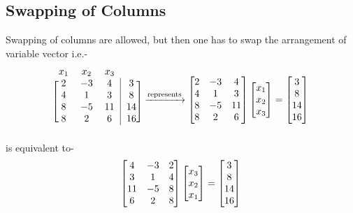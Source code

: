\documentclass{article}
\begin{document}
\subsection{Swapping of Columns}
Swapping of columns are allowed, but then one has to swap the arrangement of variable vector i.e.-
      \[
        \begin{blockarray}{cccc}
        x_1 & x_2 & x_3 && \\
        \begin{block}{[ccc|c]}
        2 & -3 & 4 & 3 \\
        4 & 1 & 3 & 8 \\
        8 & -5 & 11 & 14\\
        8 & 2 & 6 & 16 \\
        \end{block}
        \end{blockarray}
            \xrightarrow{\text{represents}}
               \begin{bmatrix}
                   2 & -3 & 4\\
                   4 & 1 & 3\\
                   8 & -5 & 11\\
                   8 & 2 & 6
               \end{bmatrix}
                    \begin{bmatrix}
                        x_1\\x_2\\x_3
                    \end{bmatrix} = 
                        \begin{bmatrix}
                            3\\8\\14\\16
                        \end{bmatrix}\\
            \]
    is equivalent to-
    \[       
        \begin{bmatrix}
        4 & -3 & 2\\
        3 & 1 & 4\\
        11 & -5 & 8\\
        6 & 2 & 8
    \end{bmatrix}
        \begin{bmatrix}
            x_3\\x_2\\x_1
        \end{bmatrix} = 
            \begin{bmatrix}
                3\\8\\14\\16
            \end{bmatrix}\\
    \]
\end{document}
